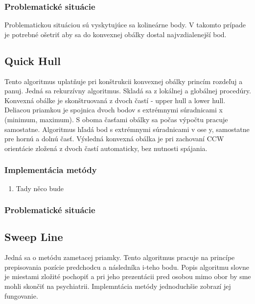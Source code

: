 \documentclass[12pt]{article}
\begin{document}
\subsubsection {Problematické situácie}
Problematickou situáciou sú vyskytujúce sa kolineárne body. V takomto prípade je potrebné ošetriť aby sa do konvexnej obálky dostal najvzdialenejší bod.

\subsection {Quick Hull}
Tento algoritmus uplatňuje pri konštrukcii konvexnej obálky princím rozdeľuj a panuj. Jedná sa rekurzívny algoritmus. Skladá sa z lokálnej a globálnej procedúry. Konvexná obálke je skonštruovaná z dvoch častí - upper hull a lower hull. Deliacou priamkou je spojnica dvoch bodov s extrémnymi súradnicami x (minimum, maximum). S oboma časťami obálky sa počas výpočtu pracuje samostatne. Algoritmus hľadá bod s extrémnymi súradnicami v ose y, samostatne pre hornú a dolnú časť. Výsledná konvexná obálka je pri zachovaní CCW orientácie zložená z dvoch častí automaticky, bez nutnosti spájania.

\subsubsection{Implementácia metódy}

\begin{enumerate}
\item Tady něco bude
\end{enumerate}

\subsubsection{Problematické situácie}

\subsection {Sweep Line}
Jedná sa o metódu zametacej priamky. Tento algoritmus pracuje na princípe prepisovania pozície predchodcu a následníka i-teho bodu. Popis algoritmu slovne je miestami zložité pochopiť a pri jeho prezentácii pred osobou mimo obor by sme mohli skončiť na psychiatrii. Implemntácia metódy jednoduchšie zobrazí jej fungovanie.
\end{document}
